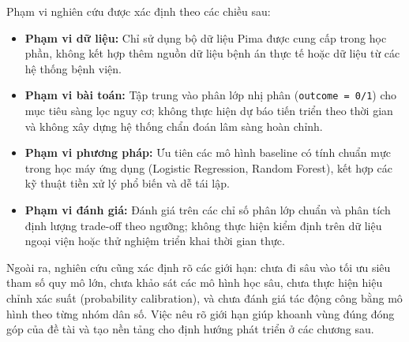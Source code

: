 Phạm vi nghiên cứu được xác định theo các chiều sau:
\begin{itemize}[leftmargin=1.5em]
    \item \textbf{Phạm vi dữ liệu:} Chỉ sử dụng bộ dữ liệu Pima được cung cấp trong học phần, không kết hợp thêm nguồn dữ liệu
    bệnh án thực tế hoặc dữ liệu từ các hệ thống bệnh viện.

    \item \textbf{Phạm vi bài toán:} Tập trung vào phân lớp nhị phân (\texttt{outcome = 0/1}) cho mục tiêu sàng lọc nguy cơ;
    không thực hiện dự báo tiến triển theo thời gian và không xây dựng hệ thống chẩn đoán lâm sàng hoàn chỉnh.

    \item \textbf{Phạm vi phương pháp:} Ưu tiên các mô hình baseline có tính chuẩn mực trong học máy ứng dụng (Logistic Regression,
    Random Forest), kết hợp các kỹ thuật tiền xử lý phổ biến và dễ tái lập.

    \item \textbf{Phạm vi đánh giá:} Đánh giá trên các chỉ số phân lớp chuẩn và phân tích định lượng trade-off theo ngưỡng;
    không thực hiện kiểm định trên dữ liệu ngoại viện hoặc thử nghiệm triển khai thời gian thực.
\end{itemize}

Ngoài ra, nghiên cứu cũng xác định rõ các giới hạn: chưa đi sâu vào tối ưu siêu tham số quy mô lớn, chưa khảo sát các mô hình
học sâu, chưa thực hiện hiệu chỉnh xác suất (probability calibration), và chưa đánh giá tác động công bằng mô hình theo từng nhóm
dân số. Việc nêu rõ giới hạn giúp khoanh vùng đúng đóng góp của đề tài và tạo nền tảng cho định hướng phát triển ở các chương sau.

